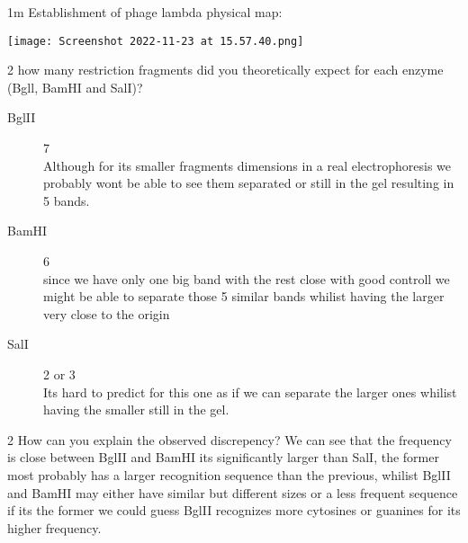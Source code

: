 \documentclass[\mainfilename]{subfiles}
\begin{document}
\begin{questionBox}1m{ %
    Establishment of phage lambda physical map:
} %
    
    \begin{center}
        \texttt{[image: Screenshot 2022-11-23 at 15.57.40.png]}
    \end{center}
    

    \begin{questionBox}2{ %
        how many restriction fragments did you theoretically expect for each enzyme (Bgll, BamHI and SalI)?
    } %
        \begin{description}
           \item[BglII] 7\\
           Although for its smaller fragments dimensions in a real electrophoresis we probably wont be able to see them separated or still in the gel resulting in 5 bands.
           \item[BamHI] 6\\
           since we have only one big band with the rest close with good controll we might be able to separate those 5 similar bands whilist having the larger very close to the origin
           \item[SalI] 2 or 3\\
           Its hard to predict for this one as if we can separate the larger ones whilist having the smaller still in the gel.
        \end{description}
    \end{questionBox}

    \begin{questionBox}2{ %
        How can you explain the observed discrepency?
    } %
        We can see that the frequency is close between BglII and BamHI its significantly larger than SalI, the former most probably has a larger recognition sequence than the previous, whilist BglII and BamHI may either have similar but different sizes or a less frequent sequence if its the former we could guess BglII recognizes more cytosines or guanines for its higher frequency.
    \end{questionBox}

\end{questionBox}
\end{document}
